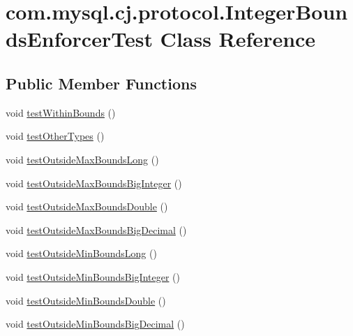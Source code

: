 \hypertarget{classcom_1_1mysql_1_1cj_1_1protocol_1_1_integer_bounds_enforcer_test}{}\section{com.\+mysql.\+cj.\+protocol.\+Integer\+Bounds\+Enforcer\+Test Class Reference}
\label{classcom_1_1mysql_1_1cj_1_1protocol_1_1_integer_bounds_enforcer_test}
\subsection*{Public Member Functions}
\begin{DoxyCompactItemize}
\item 
void \mbox{\hyperlink{classcom_1_1mysql_1_1cj_1_1protocol_1_1_integer_bounds_enforcer_test_a3353cc6444d842c8bb10d4ff94946677}{test\+Within\+Bounds}} ()
\item 
void \mbox{\hyperlink{classcom_1_1mysql_1_1cj_1_1protocol_1_1_integer_bounds_enforcer_test_aa0a942a4a10989906ca856e272bd9e05}{test\+Other\+Types}} ()
\item 
void \mbox{\hyperlink{classcom_1_1mysql_1_1cj_1_1protocol_1_1_integer_bounds_enforcer_test_a9f83d8d80267d0d89d9339304733e5bf}{test\+Outside\+Max\+Bounds\+Long}} ()
\item 
void \mbox{\hyperlink{classcom_1_1mysql_1_1cj_1_1protocol_1_1_integer_bounds_enforcer_test_a6c88a41405b6317a3027b993c7ec7706}{test\+Outside\+Max\+Bounds\+Big\+Integer}} ()
\item 
void \mbox{\hyperlink{classcom_1_1mysql_1_1cj_1_1protocol_1_1_integer_bounds_enforcer_test_a4edf97bdbf531f5d8ab3bed4f0a58035}{test\+Outside\+Max\+Bounds\+Double}} ()
\item 
void \mbox{\hyperlink{classcom_1_1mysql_1_1cj_1_1protocol_1_1_integer_bounds_enforcer_test_abbcf073ed04e989f985aafb074bd2f65}{test\+Outside\+Max\+Bounds\+Big\+Decimal}} ()
\item 
void \mbox{\hyperlink{classcom_1_1mysql_1_1cj_1_1protocol_1_1_integer_bounds_enforcer_test_ac8e17851de4283ff34294c3e877e6fc8}{test\+Outside\+Min\+Bounds\+Long}} ()
\item 
void \mbox{\hyperlink{classcom_1_1mysql_1_1cj_1_1protocol_1_1_integer_bounds_enforcer_test_acc7700872dae62f58dd7b436e89d3f28}{test\+Outside\+Min\+Bounds\+Big\+Integer}} ()
\item 
void \mbox{\hyperlink{classcom_1_1mysql_1_1cj_1_1protocol_1_1_integer_bounds_enforcer_test_aadb0a9eacd0f267f63c08898f5695504}{test\+Outside\+Min\+Bounds\+Double}} ()
\item 
void \mbox{\hyperlink{classcom_1_1mysql_1_1cj_1_1protocol_1_1_integer_bounds_enforcer_test_ad7f36c005ed375a37bf287c6c27b960f}{test\+Outside\+Min\+Bounds\+Big\+Decimal}} ()
\end{DoxyCompactItemize}


